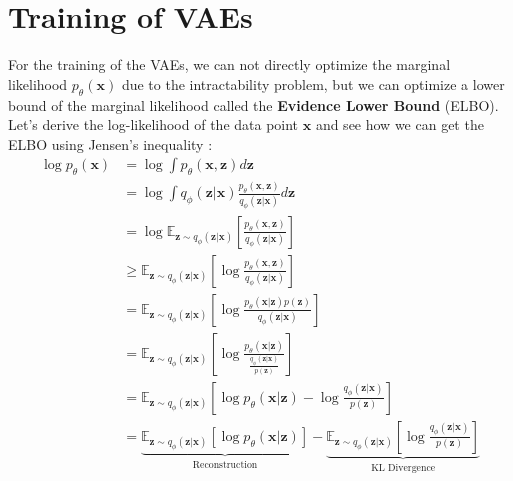 \section{Training of VAEs} 
For the training of the VAEs, we can not directly optimize the marginal likelihood $p_{\theta}(\mathbf{x})$ due to the intractability problem, but we can optimize a lower bound of the marginal likelihood
called the \textbf{Evidence Lower Bound} (ELBO). Let's derive the log-likelihood of the data point $\mathbf{x}$ and see how we can get the ELBO using Jensen's inequality \cite{Kingma_2019}:
\begin{align}
    \log p_{\theta}(\mathbf{x}) &= \log\int p_{\theta}(\mathbf{x},\mathbf{z})d\mathbf{z} \\ %
    &= \log\int q_{\phi}(\mathbf{z}|\mathbf{x})\frac{p_{\theta}(\mathbf{x}, \mathbf{z})}{q_{\phi}(\mathbf{z}|\mathbf{x})}d\mathbf{z} \\
    &= \log \mathbb{E}_{\mathbf{z}\sim q_{\phi}(\mathbf{z}|\mathbf{x})} \left[\frac{p_{\theta}(\mathbf{x},\mathbf{z})}{q_{\phi}(\mathbf{z}|\mathbf{x})}\right] \\
    &\geq \mathbb{E}_{\mathbf{z}\sim q_{\phi}(\mathbf{z}|\mathbf{x})} \left[\log \frac{p_{\theta}(\mathbf{x},\mathbf{z})}{q_{\phi}(\mathbf{z}|\mathbf{x})}\right] \\
    &= \mathbb{E}_{\mathbf{z}\sim q_{\phi}(\mathbf{z}|\mathbf{x})} \left[\log \frac{p_{\theta}(\mathbf{x}|\mathbf{z})p(\mathbf{z})}{q_{\phi}(\mathbf{z}|\mathbf{x})}\right] \\
    &= \mathbb{E}_{\mathbf{z}\sim q_{\phi}(\mathbf{z}|\mathbf{x})} \left[\log \frac{p_{\theta}(\mathbf{x}|\mathbf{z})}{\frac{q_{\phi}(\mathbf{z}|\mathbf{x})}{p(\mathbf{z})}}\right] \\
    &= \mathbb{E}_{\mathbf{z}\sim q_{\phi}(\mathbf{z}|\mathbf{x})} \left[\log p_{\theta}(\mathbf{x}|\mathbf{z}) - \log \frac{q_{\phi}(\mathbf{z}|\mathbf{x})}{p(\mathbf{z})}\right] \\
    &= \underbrace{\mathbb{E}_{\mathbf{z}\sim q_{\phi}(\mathbf{z}|\mathbf{x})} \left[\log p_{\theta}(\mathbf{x}|\mathbf{z})\right]}_{\text{Reconstruction}} - \underbrace{\mathbb{E}_{\mathbf{z}\sim q_{\phi}(\mathbf{z}|\mathbf{x})} \left[\log \frac{q_{\phi}(\mathbf{z}|\mathbf{x})}{p(\mathbf{z})}\right]}_{\text{KL Divergence}}
\end{align}

